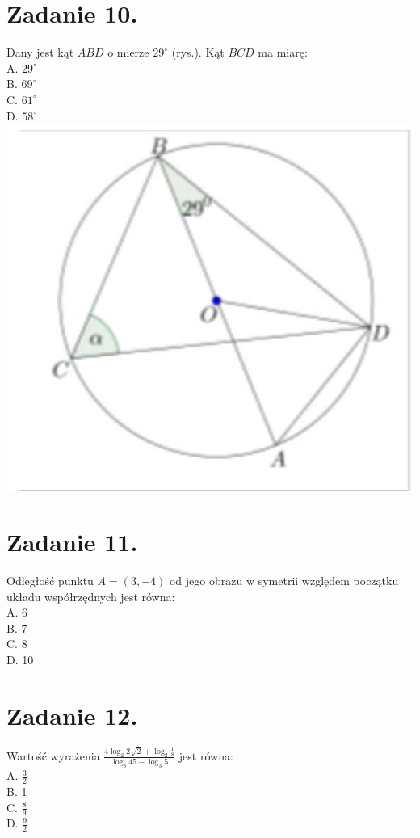 \documentclass[10pt]{article}
\begin{document}
\section*{Zadanie 10.}
Dany jest kąt \(A B D\) o mierze \(29^{\circ}\) (rys.). Kąt \(B C D\) ma miarę:\\
A. \(29^{\circ}\)\\
B. \(69^{\circ}\)\\
C. \(61^{\circ}\)\\
D. \(58^{\circ}\)\\
\includegraphics[max width=\textwidth, center]{2024_11_21_94f02db55673a8a7b820g-06}

\section*{Zadanie 11.}
Odległość punktu \(A=(3,-4)\) od jego obrazu w symetrii względem początku układu współrzędnych jest równa:\\
A. 6\\
B. 7\\
C. 8\\
D. 10

\section*{Zadanie 12.}
Wartość wyrażenia \(\frac{4 \log _{2} 2 \sqrt{2}+\log _{2} \frac{1}{8}}{\log _{3} 45-\log _{3} 5}\) jest równa:\\
A. \(\frac{3}{2}\)\\
B. 1\\
C. \(\frac{8}{9}\)\\
D. \(\frac{9}{2}\)
\end{document}
